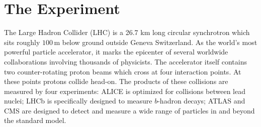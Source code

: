 \chapter{The Experiment}

The Large Hadron Collider (LHC) is a 26.7 km long circular synchrotron which sits roughly $100\,\textrm{m}$ below ground outside Geneva Switzerland.
As the world's most powerful particle accelerator, it marks the epicenter of several worldwide collaborations involving thousands of physicists.
The accelerator itself contains two counter-rotating proton beams which cross at four interaction points. At these points protons collide head-on.
The products of these collisions are measured by four experiments: ALICE is optimized for collisions between lead nuclei; LHCb is specifically designed to measure $b$-hadron decays; ATLAS and CMS are designed to detect and measure a wide range of particles in and beyond the standard model.


\label{sec:lhc}


